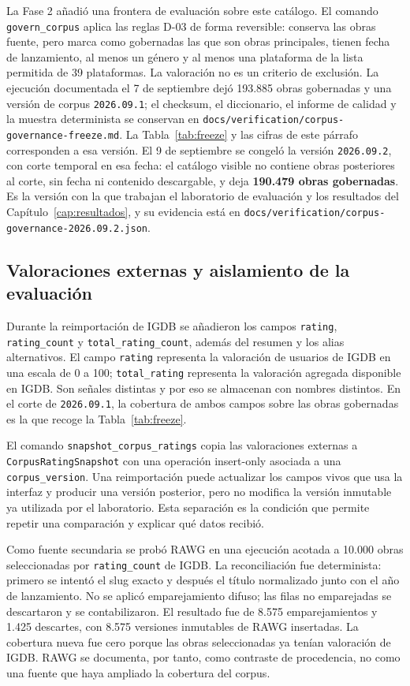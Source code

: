 La Fase 2 añadió una frontera de evaluación sobre este catálogo. El comando
\texttt{govern\_corpus} aplica las reglas D-03 de forma reversible: conserva las obras
fuente, pero marca como gobernadas las que son obras principales, tienen fecha de lanzamiento,
al menos un género y al menos una plataforma de la lista permitida de 39 plataformas. La valoración no es un criterio de
exclusión. La ejecución documentada el 7 de septiembre dejó 193.885 obras gobernadas y una versión de corpus
\texttt{2026.09.1}; el checksum, el diccionario, el informe de calidad y la muestra
determinista se conservan en \texttt{docs/verification/corpus-governance-freeze.md}. La
Tabla~\ref{tab:freeze} y las cifras de este párrafo corresponden a esa versión. El 9 de septiembre se
congeló la versión \texttt{2026.09.2}, con corte temporal en esa fecha: el catálogo visible no contiene
obras posteriores al corte, sin fecha ni contenido descargable, y deja \textbf{190.479 obras
gobernadas}. Es la versión con la que trabajan el laboratorio de evaluación y los resultados del
Capítulo~\ref{cap:resultados}, y su evidencia está en
\texttt{docs/verification/corpus-governance-2026.09.2.json}.

\subsection{Valoraciones externas y aislamiento de la evaluación}\label{sec:datos-ratings}

Durante la reimportación de IGDB se añadieron los campos \texttt{rating},
\texttt{rating\_count} y \texttt{total\_rating\_count}, además del resumen y los alias
alternativos. El campo \texttt{rating} representa la valoración de usuarios de IGDB en una
escala de 0 a 100; \texttt{total\_rating} representa la valoración agregada disponible en
IGDB. Son señales distintas y por eso se almacenan con nombres distintos. En el corte de
\texttt{2026.09.1}, la cobertura de ambos campos sobre las obras gobernadas es la que recoge
la Tabla~\ref{tab:freeze}.

El comando \texttt{snapshot\_corpus\_ratings} copia las valoraciones externas a
\texttt{CorpusRatingSnapshot} con una operación insert-only asociada a una
\texttt{corpus\_version}. Una reimportación puede actualizar los campos vivos que usa la
interfaz y producir una versión posterior, pero no modifica la versión inmutable ya
utilizada por el laboratorio. Esta separación es la condición que permite repetir una
comparación y explicar qué datos recibió.

Como fuente secundaria se probó RAWG en una ejecución acotada a 10.000 obras seleccionadas
por \texttt{rating\_count} de IGDB. La reconciliación fue determinista: primero se intentó
el slug exacto y después el título normalizado junto con el año de lanzamiento. No se aplicó
emparejamiento difuso; las filas no emparejadas se descartaron y se contabilizaron. El resultado
fue de 8.575 emparejamientos y 1.425 descartes, con 8.575 versiones inmutables de RAWG insertadas. La
cobertura nueva fue cero porque las obras seleccionadas ya tenían valoración de IGDB. RAWG se
documenta, por tanto, como contraste de procedencia, no como una fuente que haya ampliado
la cobertura del corpus.

